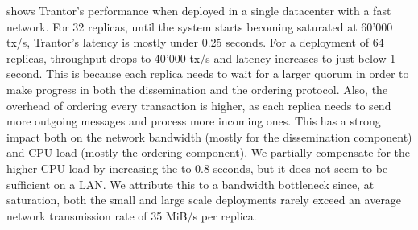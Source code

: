 \documentclass{article}
\begin{document}


 shows Trantor's performance when deployed in a single datacenter with a fast network.
For 32 replicas, until the system starts becoming saturated at 60'000 tx/s, Trantor's latency is mostly under 0.25 seconds.
For a deployment of 64 replicas, throughput drops to 40'000 tx/s and latency increases to just below 1 second.
This is because each replica needs to wait for a larger quorum in order to make progress in both the dissemination and the ordering protocol.
Also, the overhead of ordering every transaction is higher, as each replica needs to send more outgoing messages and process more incoming ones.
This has a strong impact both on the network bandwidth (mostly for the dissemination component) and CPU load (mostly the ordering component).
We partially compensate for the higher CPU load by increasing the  to 0.8 seconds,
but it does not seem to be sufficient on a LAN.
We attribute this to a bandwidth bottleneck since, at saturation, both the small and large scale deployments
rarely exceed an average network transmission rate of 35 MiB/s per replica.
\end{document}
